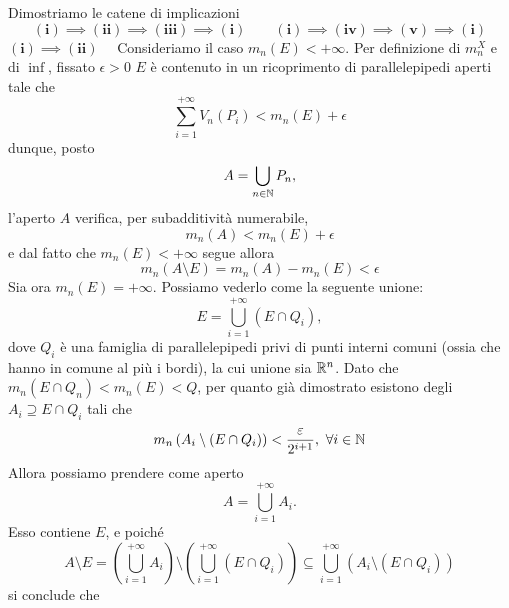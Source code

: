 \begin{demonstration}
	Dimostriamo le catene di implicazioni
	\begin{equation*}
		\mathbf{(i)\implies (ii)\implies (iii)\implies (i)\qquad(i)\implies (iv)\implies (v)\implies (i)}
	\end{equation*}
$\mathbf{(i)\implies(ii)}\quad$ Consideriamo il caso $m_n(E)<+\infty$. Per definizione di $m^{X}_n$ e di $\inf$, fissato $\epsilon >0$ $E$ è contenuto in un ricoprimento di parallelepipedi aperti tale che
\begin{equation*}
	\sum_{i=1}^{+\infty}V_n\left(P_i\right)<m_n(E)+\epsilon
\end{equation*}
dunque, posto
\begin{equation*}
	A=\bigcup_{n\in\mathbb{N}}P_n,
\end{equation*}
l'aperto $A$ verifica, per subadditività numerabile,
\begin{equation*}
	m_n\left(A\right)<m_n(E)+\epsilon
\end{equation*}
e dal fatto che $m_n(E)<+\infty$ segue allora %
\begin{equation*}
	m_n\left(A\setminus E\right)=m_n\left(A\right)-m_n(E)<\epsilon
\end{equation*}
Sia ora $m_n(E)=+\infty$. Possiamo vederlo come la seguente unione:
\begin{equation*}
	E=\bigcup_{i=1}^{+\infty}\left(E\cap Q_i\right),
\end{equation*}
dove $Q_i$ è una famiglia di parallelepipedi privi di punti interni comuni (ossia che hanno in comune al più i bordi), la cui unione sia $\mathbb{R}^n$. Dato che $m_n\left(E\cap Q_n\right)<m_n(E)<Q$, per quanto già dimostrato esistono degli $A_i\supseteq E\cap Q_i$ tali che
\begin{equation*}
	m_n\left(A_i\setminus\left(E\cap Q_i\right)\right)<\frac{\varepsilon}{2^{i+1}},\ \forall i\in\mathbb{N}
\end{equation*}
Allora possiamo prendere come aperto
\begin{equation*}
	A=\bigcup_{i=1}^{+\infty}A_i.
\end{equation*}
Esso contiene $E$, e poiché
\begin{equation*}
	A\setminus E=\left(\bigcup_{i=1}^{+\infty}A_i\right)\setminus\left(\bigcup_{i=1}^{+\infty}\left(E\cap Q_i\right)\right)\subseteq\bigcup_{i=1}^{+\infty}\left(A_i\setminus\left(E\cap Q_i\right)\right)
\end{equation*}
si conclude che
\begin{equation*}

\end{equation*}
\end{demonstration}
